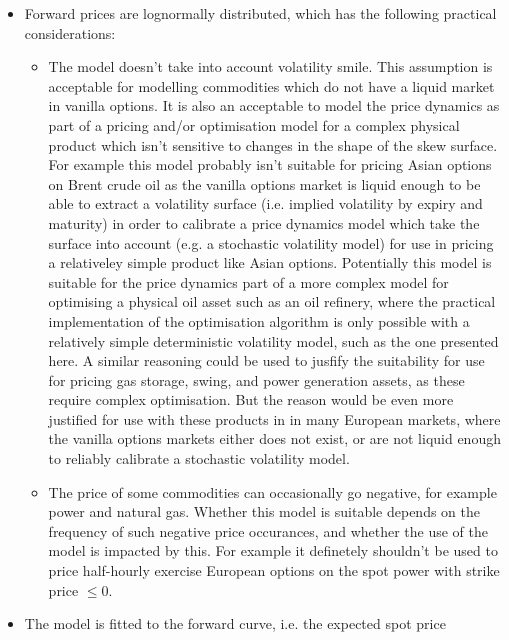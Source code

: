 \documentclass{article}
\begin{document}
\begin{itemize}
    \item Forward prices are lognormally distributed, which has the following practical
    considerations: 
    \begin{itemize}
        \item The model doesn't take into account volatility smile. This assumption is
        acceptable for modelling commodities which do not have a liquid market in vanilla 
        options. It is also an acceptable to model the price dynamics as part of a pricing
        and/or optimisation model for a complex physical product which isn't sensitive
        to changes in the shape of the skew surface. For example this model probably isn't
        suitable for pricing Asian options on Brent crude oil as the vanilla options market
        is liquid enough to be able to extract a volatility surface (i.e. implied volatility
        by expiry and maturity) in order to calibrate a price dynamics model which take the surface into account
        (e.g. a stochastic volatility model) for use in pricing a relativeley simple product like 
        Asian options. Potentially this model is suitable for the price dynamics part of a 
        more complex model for 
        optimising a physical oil asset such as an oil refinery, where the 
        practical implementation of the optimisation algorithm is only possible with a relatively
        simple deterministic volatility model, such as the one presented here. A similar reasoning
        could be used to jusfify the suitability for use for pricing gas storage, swing, and
        power generation assets, as these require complex optimisation. But the reason would
        be even more justified for use with these products in in many European markets, 
        where the vanilla options
        markets either does not exist, or are not liquid enough to reliably calibrate a
        stochastic volatility model.
        \item The price of some commodities can occasionally go negative, for example
        power and natural gas. Whether this model is suitable depends on the frequency
        of such negative price occurances, and whether the use of the model is impacted
        by this. For example it definetely shouldn't be used to price half-hourly exercise
        European options on the spot power with strike price $\leq 0$.
    \end{itemize}
    \item The model is fitted to the forward curve, i.e. the expected spot price 

\end{itemize}
\end{document}

